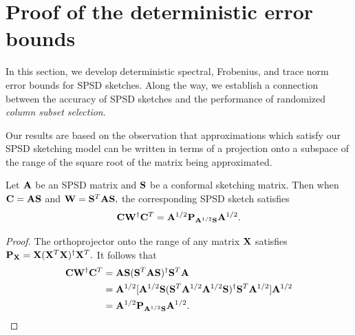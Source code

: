 
\section{Proof of the deterministic error bounds}
\label{ch4:sec:structuralresults}

In this section, we develop deterministic spectral, Frobenius, and trace norm 
error bounds for SPSD sketches. Along the way, we establish a connection 
between the accuracy of SPSD sketches and the performance of randomized 
\emph{column subset selection}.

Our results are based on the observation that approximations which satisfy our SPSD
sketching model can be written in terms of a projection onto a subspace of the range
of the square root of the matrix being approximated.

\begin{lemma}
 Let $\mathbf{A}$ be an SPSD matrix and $\mathbf{S}$ be a conformal sketching matrix. Then when
 $\mathbf{C} = \mathbf{A} \mathbf{S}$ and $\mathbf{W} = \mathbf{S}^T \mathbf{A} \mathbf{S},$ the corresponding
 SPSD sketch satisfies
 \[
  \mathbf{C}\mathbf{W}^\dagger \mathbf{C}^T = \mathbf{A}^{1/2} \mathbf{P}_{\mathbf{A}^{1/2}\mathbf{S}} \mathbf{A}^{1/2}.
 \]
 \label{ch4:lem:proj-form-of-sketch}
\end{lemma}

\begin{proof}
 The orthoprojector onto the range of any matrix $\mathbf{X}$ satisfies 
 $\mathbf{P}_{\mathbf{X}} = \mathbf{X} (\mathbf{X}^T \mathbf{X})^\dagger \mathbf{X}^T.$
 It follows that
 \begin{align*}
 \mathbf{C} \mathbf{W}^\dagger \mathbf{C}^T & = \mathbf{A} \mathbf{S} (\mathbf{S}^T\mathbf{A}\mathbf{S})^\dagger \mathbf{S}^T \mathbf{A} \\
  & = \mathbf{A}^{1/2}[\mathbf{A}^{1/2} \mathbf{S} (\mathbf{S}^T \mathbf{A}^{1/2} \mathbf{A}^{1/2}\mathbf{S})^\dagger \mathbf{S}^T\mathbf{A}^{1/2}]\mathbf{A}^{1/2} \\
  & = \mathbf{A}^{1/2} \mathbf{P}_{\mathbf{A}^{1/2} \mathbf{S}} \mathbf{A}^{1/2}.
 \end{align*}
\end{proof}


